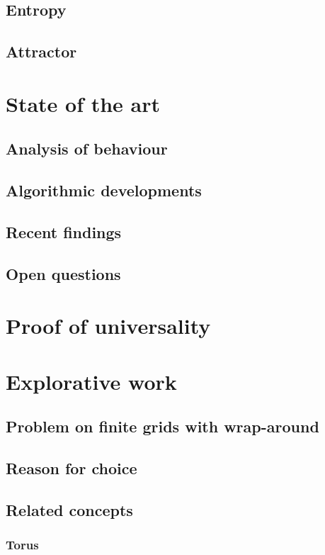 \documentclass{article}
\begin{document}
\subsection{Entropy}
\subsection{Attractor}

\section{State of the art}
\subsection{Analysis of behaviour}
\subsection{Algorithmic developments}
\subsection{Recent findings}
\subsection{Open questions}

\section{Proof of universality}

\section{Explorative work}
\subsection{Problem on finite grids with wrap-around}
\subsection{Reason for choice}
\subsection{Related concepts}
\subsubsection{Torus}
\end{document}
